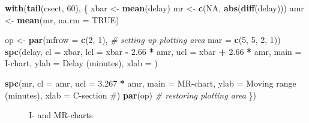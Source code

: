 \documentclass[
]{book}
\makeatletter
\newenvironment{Shaded}{\begin{snugshade}}{\end{snugshade}}
\newcommand{\AttributeTok}[1]{\textcolor[rgb]{0.13,0.29,0.53}{#1}}
\newcommand{\CommentTok}[1]{\textcolor[rgb]{0.56,0.35,0.01}{\textit{#1}}}
\newcommand{\ConstantTok}[1]{\textcolor[rgb]{0.56,0.35,0.01}{#1}}
\newcommand{\DecValTok}[1]{\textcolor[rgb]{0.00,0.00,0.81}{#1}}
\newcommand{\FloatTok}[1]{\textcolor[rgb]{0.00,0.00,0.81}{#1}}
\newcommand{\FunctionTok}[1]{\textcolor[rgb]{0.13,0.29,0.53}{\textbf{#1}}}
\newcommand{\NormalTok}[1]{#1}
\newcommand{\OtherTok}[1]{\textcolor[rgb]{0.56,0.35,0.01}{#1}}
\newcommand{\SpecialCharTok}[1]{\textcolor[rgb]{0.81,0.36,0.00}{\textbf{#1}}}
\newcommand{\StringTok}[1]{\textcolor[rgb]{0.31,0.60,0.02}{#1}}
\newcommand*\pandocbounded[1]{%
  \sbox\pandoc@box{#1}%
  \Gscale@div\@tempa{\textheight}{\dimexpr\ht\pandoc@box+\dp\pandoc@box\relax}%
  \Gscale@div\@tempb{\linewidth}{\wd\pandoc@box}%
  \ifdim\@tempb\p@<\@tempa\p@\let\@tempa\@tempb\fi%
  \ifdim\@tempa\p@<\p@\scalebox{\@tempa}{\usebox\pandoc@box}%
  \else\usebox{\pandoc@box}%
  \fi%
}
\makeatother
\begin{document}
\begin{Shaded}
\begin{Highlighting}[]
\FunctionTok{with}\NormalTok{(}\FunctionTok{tail}\NormalTok{(csect, }\DecValTok{60}\NormalTok{), \{}
\NormalTok{  xbar }\OtherTok{\textless{}{-}} \FunctionTok{mean}\NormalTok{(delay)}
\NormalTok{  mr   }\OtherTok{\textless{}{-}} \FunctionTok{c}\NormalTok{(}\ConstantTok{NA}\NormalTok{, }\FunctionTok{abs}\NormalTok{(}\FunctionTok{diff}\NormalTok{(delay)))}
\NormalTok{  amr  }\OtherTok{\textless{}{-}} \FunctionTok{mean}\NormalTok{(mr, }\AttributeTok{na.rm =} \ConstantTok{TRUE}\NormalTok{)}
  
\NormalTok{  op }\OtherTok{\textless{}{-}} \FunctionTok{par}\NormalTok{(}\AttributeTok{mfrow =} \FunctionTok{c}\NormalTok{(}\DecValTok{2}\NormalTok{, }\DecValTok{1}\NormalTok{),           }\CommentTok{\# setting up plotting area}
            \AttributeTok{mar   =} \FunctionTok{c}\NormalTok{(}\DecValTok{5}\NormalTok{, }\DecValTok{5}\NormalTok{, }\DecValTok{2}\NormalTok{, }\DecValTok{1}\NormalTok{))}
  \FunctionTok{spc}\NormalTok{(delay,}
      \AttributeTok{cl   =}\NormalTok{ xbar,}
      \AttributeTok{lcl  =}\NormalTok{ xbar }\SpecialCharTok{{-}} \FloatTok{2.66} \SpecialCharTok{*}\NormalTok{ amr,}
      \AttributeTok{ucl  =}\NormalTok{ xbar }\SpecialCharTok{+} \FloatTok{2.66} \SpecialCharTok{*}\NormalTok{ amr,}
      \AttributeTok{main =} \StringTok{\textquotesingle{}I{-}chart\textquotesingle{}}\NormalTok{,}
      \AttributeTok{ylab =} \StringTok{\textquotesingle{}Delay (minutes)\textquotesingle{}}\NormalTok{,}
      \AttributeTok{xlab =} \StringTok{\textquotesingle{}\textquotesingle{}}\NormalTok{)}
  
  \FunctionTok{spc}\NormalTok{(mr,}
      \AttributeTok{cl   =}\NormalTok{ amr,}
      \AttributeTok{ucl  =} \FloatTok{3.267} \SpecialCharTok{*}\NormalTok{ amr,}
      \AttributeTok{main =} \StringTok{\textquotesingle{}MR{-}chart\textquotesingle{}}\NormalTok{,}
      \AttributeTok{ylab =} \StringTok{\textquotesingle{}Moving range (minutes)\textquotesingle{}}\NormalTok{,}
      \AttributeTok{xlab =} \StringTok{\textquotesingle{}C{-}section \#\textquotesingle{}}\NormalTok{)}
  \FunctionTok{par}\NormalTok{(op)                              }\CommentTok{\# restoring plotting area}
\NormalTok{\})}
\end{Highlighting}
\end{Shaded}

\begin{figure}
\centering
\pandocbounded{}
\caption{\label{fig:limits-imr}I- and MR-charts}
\end{figure}
\end{document}
